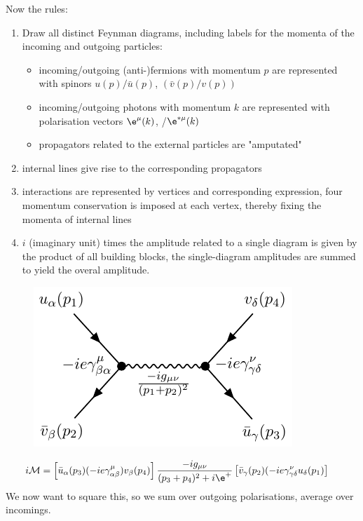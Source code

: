 \documentclass[a4paper, 11pt, normalem]{report}
\begin{document}
Now the rules:
\begin{enumerate}
    \item Draw all distinct Feynman diagrams, including labels for the momenta of the incoming and outgoing particles:
        \begin{itemize}
            \item incoming/outgoing (anti-)fermions with momentum $p$ are represented with spinors $u(p)/\bar{u}(p)$,  $(\bar{v}(p)/v(p))$
            \item incoming/outgoing photons with momentum $k$ are represented with polarisation vectors $\e^\mu(k)$, /$\e^{*\mu}(k)$
            \item  propagators related to the external particles are "amputated"
        \end{itemize}
    \item internal lines give rise to the corresponding propagators
    \item interactions are represented by vertices and corresponding expression, four momentum conservation is imposed at each vertex, thereby fixing the momenta of internal lines
    \item $i$ (imaginary unit) times the amplitude related to a single diagram is given by the product of all building blocks, the single-diagram amplitudes are summed to yield the overal amplitude. 
\end{enumerate}
\begin{figure}[H]
    \centering
    \includegraphics{etomu2.pdf}
    \vspace{-25pt}
\end{figure}
\begin{align}
    i\mathcal{M} &= \left[\bar{u}_{\alpha}(p_3)(-ie\gamma^\mu_{\alpha\beta})v_\beta(p_4)\right]\frac{-ig_{\mu\nu}}{(p_3+p_4)^2+i\e^+}\left[\bar{v}_\gamma(p_2)(-ie\gamma^\nu_{\gamma\delta}u_\delta(p_1)\right]
\end{align}
We now want to square this, so we sum over outgoing polarisations, average over incomings. 
\end{document}
